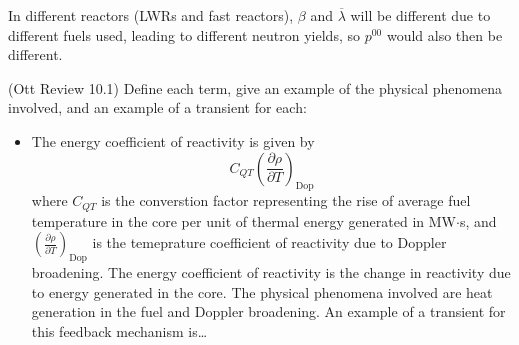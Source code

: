 \documentclass[11pt,addpoints,answers]{exam}
\begin{document}
\begin{questions}
\begin{solution}
            In different reactors (LWRs and fast reactors), $\beta$ and
            $\overline{\lambda}$ will be different due to different fuels used,
            leading to different neutron yields, so $p^{00}$ would also then
            be different.

        \end{solution}

        \question[15] (Ott Review 10.1) Define each term, give an example of the 
        physical phenomena involved, and an example of a transient for each: 
        \begin{solution}
            \begin{itemize}
                \item The energy coefficient of reactivity is given by
                    \begin{equation}
                        C_{QT} \left(\frac{\partial \rho}{\partial
                        T}\right)_\text{Dop}
                    \end{equation}
                    where $C_{QT}$ is the converstion factor representing the
                    rise of average fuel temperature in the core per unit of
                    thermal energy generated in MW$\cdot$s, and
                    $\left(\frac{\partial \rho}{\partial T}\right)_\text{Dop}$
                    is the temeprature coefficient of reactivity due to Doppler
                    broadening. The energy coefficient of reactivity is the
                    change in reactivity due to energy generated in the core.
                    The physical phenomena involved are heat
                    generation in the fuel and Doppler broadening. An example
                    of a transient for this feedback mechanism is\ldots
            \end{itemize}
        \end{solution}
       
       
\end{questions}



%
%
\end{document}

